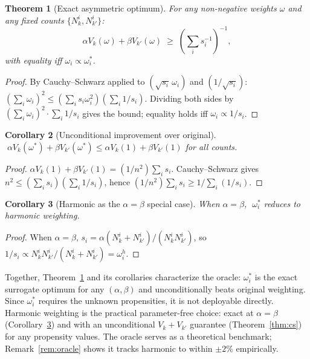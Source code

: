 \documentclass[sigconf]{acmart}
\newtheorem{theorem}{Theorem}
\newtheorem{corollary}[theorem]{Corollary}
\begin{document}
\begin{theorem}[Exact asymmetric optimum]
\label{thm:asymmetric}
For any non-negative weights $\omega$ and any fixed counts $\{N_k^i, N_{k'}^i\}$:
\[
\alpha V_k(\omega) + \beta V_{k'}(\omega) \;\geq\; \left(\sum_i s_i^{-1}\right)^{-1},
\]
with equality iff $\omega_i \propto \omega_i^*$.
\end{theorem}

\begin{proof}
By Cauchy–Schwarz applied to $(\sqrt{s_i}\,\omega_i)$ and $(1/\sqrt{s_i})$:
$(\sum_i \omega_i)^2 \leq (\sum_i s_i \omega_i^2)(\sum_i 1/s_i)$.
Dividing both sides by $(\sum_i \omega_i)^2 \cdot \sum_i 1/s_i$ gives the bound; equality holds iff $\omega_i \propto 1/s_i$.
\end{proof}

\begin{corollary}[Unconditional improvement over original]
\label{cor:beats_original}
$\;\alpha V_k(\omega^*) + \beta V_{k'}(\omega^*) \leq \alpha V_k(1) + \beta V_{k'}(1)$ for all counts.
\end{corollary}

\begin{proof}
$\alpha V_k(1)+\beta V_{k'}(1) = (1/n^2)\sum_i s_i$. Cauchy–Schwarz gives $n^2 \leq (\sum_i s_i)(\sum_i 1/s_i)$, hence $(1/n^2)\sum_i s_i \geq 1/\sum_i(1/s_i)$.
\end{proof}

\begin{corollary}[Harmonic as the $\alpha=\beta$ special case]
\label{cor:harmonic_special}
When $\alpha = \beta$, $\;\omega_i^*$ reduces to harmonic weighting.
\end{corollary}

\begin{proof}
When $\alpha=\beta$, $s_i = \alpha(N_k^i+N_{k'}^i)/(N_k^i N_{k'}^i)$, so $1/s_i \propto N_k^i N_{k'}^i/(N_k^i+N_{k'}^i) = \omega_i^h$.
\end{proof}

Together, Theorem~\ref{thm:asymmetric} and its corollaries characterize the oracle: $\omega_i^*$ is the exact surrogate optimum for any $(\alpha,\beta)$ and unconditionally beats original weighting. Since $\omega_i^*$ requires the unknown propensities, it is not deployable directly. Harmonic weighting is the practical parameter-free choice: exact at $\alpha=\beta$ (Corollary~\ref{cor:harmonic_special}) and with an unconditional $V_k+V_{k'}$ guarantee (Theorem~\ref{thm:cs}) for any propensity values. The oracle serves as a theoretical benchmark; Remark~\ref{rem:oracle} shows it tracks harmonic to within $\pm2\%$ empirically.
\end{document}
